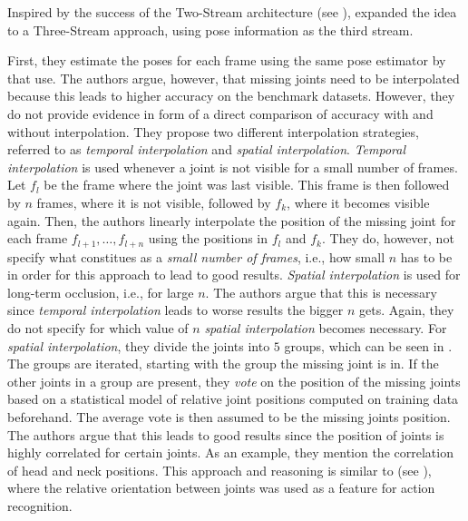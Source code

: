 Inspired by the success of the Two-Stream architecture (see ), \cite{khalid_multi-modal_2018} expanded the idea to a Three-Stream approach, using pose information as the third stream.

First, they estimate the poses for each frame using the same pose estimator by \cite{cao_realtime_2017} that \cite{choutas_potion:_2018} use.
The authors argue, however, that missing joints need to be interpolated because this leads to higher accuracy on the benchmark datasets.
However, they do not provide evidence in form of a direct comparison of accuracy with and without interpolation.
They propose two different interpolation strategies, referred to as \textit{temporal interpolation} and \textit{spatial interpolation}.
\textit{Temporal interpolation} is used whenever a joint is not visible for a small number of frames.
Let $f_l$ be the frame where the joint was last visible.
This frame is then followed by $n$ frames, where it is not visible, followed by $f_k$, where it becomes visible again.
Then, the authors linearly interpolate the position of the missing joint for each frame $f_{l+1}, \dots, f_{l+n}$ using the positions in $f_l$ and $f_k$.
They do, however, not specify what constitues as a \textit{small number of frames}, i.e., how small $n$ has to be in order for this approach to lead to good results.
\textit{Spatial interpolation} is used for long-term occlusion, i.e., for large $n$.
The authors argue that this is necessary since \textit{temporal interpolation} leads to worse results the bigger $n$ gets.
Again, they do not specify for which value of $n$ \textit{spatial interpolation} becomes necessary.
For \textit{spatial interpolation}, they divide the joints into $5$ groups, which can be seen in .
The groups are iterated, starting with the group the missing joint is in.
If the other joints in a group are present, they \textit{vote} on the position of the missing joints based on a statistical model of relative joint positions computed on training data beforehand.
The average vote is then assumed to be the missing joints position.
The authors argue that this leads to good results since the position of joints is highly correlated for certain joints.
As an example, they mention the correlation of head and neck positions.
This approach and reasoning is similar to \cite{yang_articulated_2011} (see ), where the relative orientation between joints was used as a feature for action recognition.

